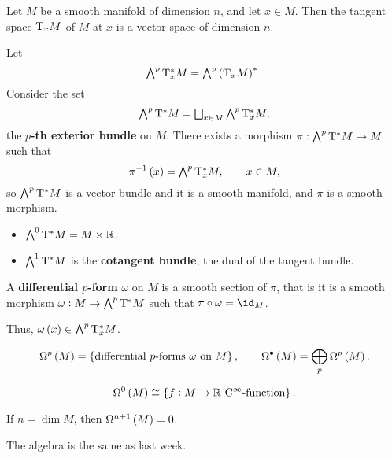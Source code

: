 Let $ M $ be a smooth manifold of dimension $ n $, and let $ x \in M $. Then the tangent space $ \mathrm{T}_xM $ of $ M $ at $ x $ is a vector space of dimension $ n $.

\begin{notation}
Let
$$ \textstyle\bigwedge^p\T_x^*M = \textstyle\bigwedge^p\br{\T_xM}^*. $$
Consider the set
$$ \textstyle\bigwedge^p\mathrm{T}^*M = \bigsqcup_{x \in M} \textstyle\bigwedge^p\mathrm{T}_x^*M, $$
the \textbf{$ p $-th exterior bundle} on $ M $. There exists a morphism $ \pi : \bigwedge^p\mathrm{T}^*M \to M $ such that
$$ \pi^{-1}\br{x} = \textstyle\bigwedge^p\T_x^*M, \qquad x \in M, $$
so $ \bigwedge^p\mathrm{T}^*M $ is a vector bundle and it is a smooth manifold, and $ \pi $ is a smooth morphism.
\end{notation}

\begin{example}
\hfill
\begin{itemize}
\item $ \bigwedge^0\mathrm{T}^*M = M \times \mathbb{R} $.
\item $ \bigwedge^1\mathrm{T}^*M $ is the \textbf{cotangent bundle}, the dual of the tangent bundle.
\end{itemize}
\end{example}


\begin{definition}
A \textbf{differential $ p $-form} $ \omega $ on $ M $ is a smooth section of $ \pi $, that is it is a smooth morphism $ \omega : M \to \bigwedge^p\mathrm{T}^*M $ such that $ \pi \circ \omega = \id_M $.
\end{definition}

Thus, $ \omega\br{x} \in \bigwedge^p\T_x^*M $.

\begin{notation}
$$ \Omega^p\br{M} = \cbr{\text{differential $ p $-forms} \ \omega \ \text{on} \ M}, \qquad \Omega^\bullet\br{M} = \bigoplus_p \Omega^p\br{M}. $$
\end{notation}

\begin{example}
$$ \Omega^0\br{M} \cong \cbr{f : M \to \RR \ \text{$ \C^\infty $-function}}. $$
\end{example}

\begin{exercise*}
If $ n = \dim M $, then $ \Omega^{n + 1}\br{M} = 0 $.
\end{exercise*}

The algebra is the same as last week.

